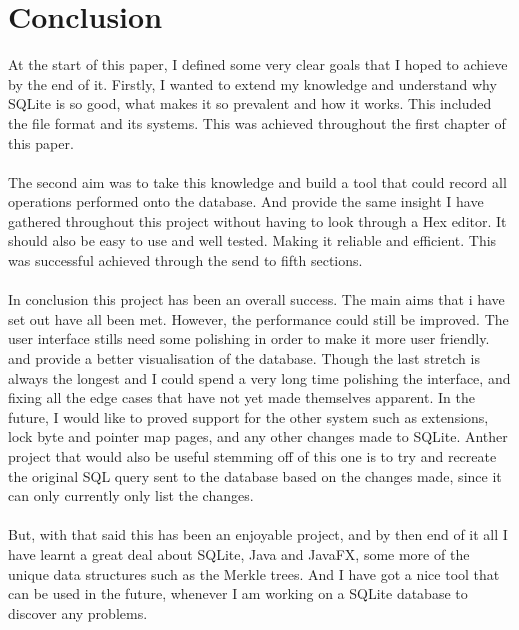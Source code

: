 \section{Conclusion}
\label{sec:conclusion}

At the start of this paper, I defined some very clear goals that I hoped to achieve by the end of it. Firstly, I wanted to extend my knowledge and understand why SQLite is so good, what makes it so prevalent and how it works. This included the file format and its systems. This was achieved throughout the first chapter of this paper. 
\\\\
The second aim was to take this knowledge and build a tool that could record all operations performed onto the database. And provide the same insight I have gathered throughout this project without having to look through a Hex editor. It should also be easy to use and well tested. Making it reliable and efficient. This was successful achieved through the send to fifth sections.
\\\\
In conclusion this project has been an overall success. The main aims that i have set out have all been met. However, the performance could still be improved. The user interface stills need some polishing in order to make it more user friendly. and provide a better visualisation of the database. Though the last stretch is always the longest and I could spend a very long time polishing the  interface, and fixing all the edge cases that have not yet made themselves apparent. In the future, I would like to proved support for the other system such as  extensions, lock byte and pointer map pages, and any other changes made to SQLite. Anther project that would also be useful stemming off of this one is to try and recreate the original SQL query sent to the database based on the changes made, since it can only currently only list the changes. 
\\\\
But, with that said this has been an enjoyable project, and by then end of it all I have learnt a great deal about SQLite, Java and JavaFX, some more of the unique data structures such as the Merkle trees. And I have got a nice tool that can be used in the future, whenever I am working on a SQLite database to discover any problems.